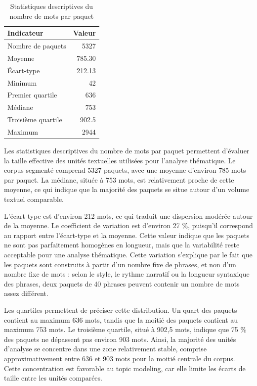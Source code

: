 \documentclass{article}
\begin{document}
\begin{table}[H]
\centering
\caption{Statistiques descriptives du nombre de mots par paquet}
\begin{tabular}{lr}
\toprule
\textbf{Indicateur} & \textbf{Valeur} \\
\midrule
Nombre de paquets & 5327 \\
Moyenne & 785.30 \\
Écart-type & 212.13 \\
Minimum & 42 \\
Premier quartile & 636 \\
Médiane & 753 \\
Troisième quartile & 902.5 \\
Maximum & 2944 \\
\bottomrule
\end{tabular}
\end{table}

Les statistiques descriptives du nombre de mots par paquet permettent d'évaluer la taille effective des unités textuelles utilisées pour l'analyse thématique. Le corpus segmenté comprend 5327 paquets, avec une moyenne d'environ 785 mots par paquet. La médiane, située à 753 mots, est relativement proche de cette moyenne, ce qui indique que la majorité des paquets se situe autour d'un volume textuel comparable.

L'écart-type est d'environ 212 mots, ce qui traduit une dispersion modérée autour de la moyenne. Le coefficient de variation est d'environ 27 \%, puisqu'il correspond au rapport entre l'écart-type et la moyenne. Cette valeur indique que les paquets ne sont pas parfaitement homogènes en longueur, mais que la variabilité reste acceptable pour une analyse thématique. Cette variation s'explique par le fait que les paquets sont construits à partir d'un nombre fixe de phrases, et non d'un nombre fixe de mots : selon le style, le rythme narratif ou la longueur syntaxique des phrases, deux paquets de 40 phrases peuvent contenir un nombre de mots assez différent.

Les quartiles permettent de préciser cette distribution. Un quart des paquets contient au maximum 636 mots, tandis que la moitié des paquets contient au maximum 753 mots. Le troisième quartile, situé à 902,5 mots, indique que 75 \% des paquets ne dépassent pas environ 903 mots. Ainsi, la majorité des unités d'analyse se concentre dans une zone relativement stable, comprise approximativement entre 636 et 903 mots pour la moitié centrale du corpus. Cette concentration est favorable au topic modeling, car elle limite les écarts de taille entre les unités comparées.
\end{document}

